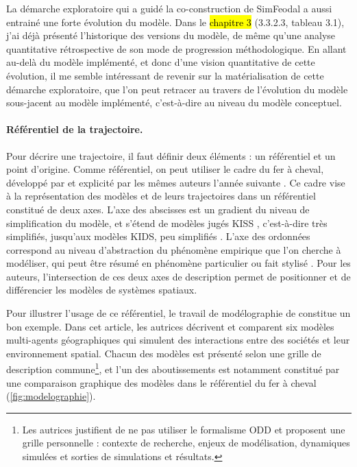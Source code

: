 La démarche exploratoire qui a guidé la co-construction de SimFeodal a aussi entrainé une forte évolution du modèle.
Dans le \hl{chapitre 3} (3.3.2.3, tableau 3.1), j'ai déjà présenté l'historique des versions du modèle, de même qu'une analyse quantitative rétrospective de son mode de progression méthodologique.
En allant au-delà du modèle implémenté, et donc d'une vision quantitative de cette évolution, il me semble intéressant de revenir sur la matérialisation de cette démarche exploratoire, que l'on peut retracer au travers de l'évolution du modèle sous-jacent au modèle implémenté, c'est-à-dire au niveau du modèle conceptuel.

\paragraph{Référentiel de la trajectoire.}
Pour décrire une trajectoire, il faut définir deux éléments : un référentiel et un point d'origine.
Comme référentiel, on peut utiliser le cadre du \og fer à cheval\fg{}, développé par \textcite{banos2012vers} et explicité par les mêmes auteurs l'année suivante \autocite{banos2013modeliser}.
Ce cadre vise à la représentation des modèles et de leurs trajectoires dans un référentiel constitué de deux axes.
L'axe des abscisses est un gradient du \og niveau de simplification du modèle\fg{}, et s'étend de modèles jugés \og KISS\fg{} \autocite{}, c'est-à-dire très simplifiés, jusqu'aux modèles \og KIDS\fg{}, peu simplifiés \autocite[840-841]{banos2013modeliser}.
L'axe des ordonnées correspond au \og niveau d'abstraction du phénomène empirique que l'on cherche à modéliser\fg{}, qui peut être résumé en \og phénomène particulier ou fait stylisé\fg{} \autocite[839-840]{banos2013modeliser}.
Pour les auteurs, l'intersection de ces deux axes de description permet de positionner et de différencier les modèles de systèmes spatiaux.

Pour illustrer l'usage de ce référentiel, le travail de \og modélographie\fg{} de \textcite{schmitt_modelographie_2013} constitue un bon exemple.
Dans cet article, les autrices décrivent et comparent six modèles multi-agents géographiques qui simulent des interactions entre des sociétés et leur environnement spatial.
Chacun des modèles est présenté selon une grille de description commune\footnote{
	Les autrices justifient de ne pas utiliser le formalisme ODD \autocite[\S 5-6]{schmitt_modelographie_2013} et proposent une grille personnelle : \og contexte de recherche\fg{}, \og enjeux de modélisation\fg{}, \og dynamiques simulées\fg{} et \og sorties de simulations et résultats\fg{}.
}, et l'un des aboutissements est notamment constitué par une comparaison graphique des modèles dans le référentiel du \og fer à cheval\fg{} (\cref{fig:modelographie}).

